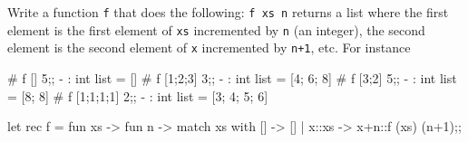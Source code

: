 

\renewcommand\AUTHOR{nweadick1@cougars.ccis.edu} %


\topmattertwo

\nextq
Write a function \verb!f! that does the following:
\verb!f xs n! returns a list where the first element is the first element of
\verb!xs! incremented by \verb!n! (an integer),
the second element is the second element of \verb!x! incremented by \verb!n+1!,
etc. For instance
\begin{console}[fontsize=\footnotesize]
# f [] 5;;
- : int list = []
# f [1;2;3] 3;;
- : int list = [4; 6; 8]
# f [3;2] 5;;
- : int list = [8; 8]
# f [1;1;1;1] 2;;
- : int list = [3; 4; 5; 6]
\end{console}
\ANSWER
\begin{answercode}
let rec f = fun xs -> fun n -> match xs with [] -> [] | x::xs -> x+n::f (xs) (n+1);;
\end{answercode}

\newpage


